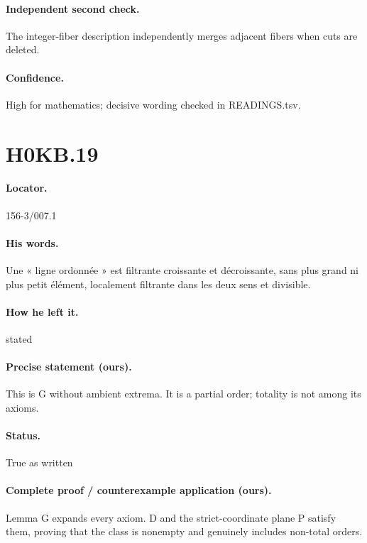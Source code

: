 \paragraph{Independent second check.} The integer-fiber description independently merges adjacent fibers when cuts are deleted.

\paragraph{Confidence.} High for mathematics; decisive wording checked in READINGS.tsv.

\section*{H0KB.19}\label{statement:H0KB.19}
\paragraph{Locator.} 156-3/007.1

\paragraph{His words.} Une « ligne ordonnée » est filtrante croissante et décroissante, sans plus grand ni plus petit élément, localement filtrante dans les deux sens et divisible.

\paragraph{How he left it.} stated

\paragraph{Precise statement (ours).} This is G without ambient extrema. It is a partial order; totality is not among its axioms.

\paragraph{Status.} True as written

\paragraph{Complete proof / counterexample application (ours).} Lemma G expands every axiom. D and the strict-coordinate plane P satisfy them, proving that the class is nonempty and genuinely includes non-total orders.

